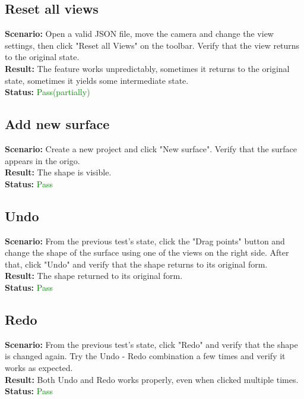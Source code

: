 \documentclass[a4paper, 11pt, article]{report}
\begin{document}
\subsection{Reset all views}

\noindent \textbf{Scenario:} Open a valid JSON file, move the camera and change the view settings, then click "Reset all Views" on the toolbar. Verify that the view returns to the original state.
\\
\noindent \textbf{Result:} The feature works unpredictably, sometimes it returns to the original state, sometimes it yields some intermediate state.
\\
\noindent \textbf{Status:} \textcolor{green}{Pass(partially)}

\subsection{Add new surface}

\noindent \textbf{Scenario:} Create a new project and click "New surface". Verify that the surface appears in the origo.
\\
\noindent \textbf{Result:} The shape is visible.
\\
\noindent \textbf{Status:} \textcolor{green}{Pass}

\subsection{Undo}

\noindent \textbf{Scenario:} From the previous test's state, click the "Drag points" button and change the shape of the surface using one of the views on the right side. After that, click "Undo" and verify that the shape returns to its original form.
\\
\noindent \textbf{Result:} The shape returned to its original form.
\\
\noindent \textbf{Status:} \textcolor{green}{Pass}

\subsection{Redo}

\noindent \textbf{Scenario:} From the previous test's state, click "Redo" and verify that the shape is changed again. Try the Undo - Redo combination a few times and verify it works as expected.
\\
\noindent \textbf{Result:} Both Undo and Redo works properly, even when clicked multiple times.
\\
\noindent \textbf{Status:} \textcolor{green}{Pass}
\end{document}
